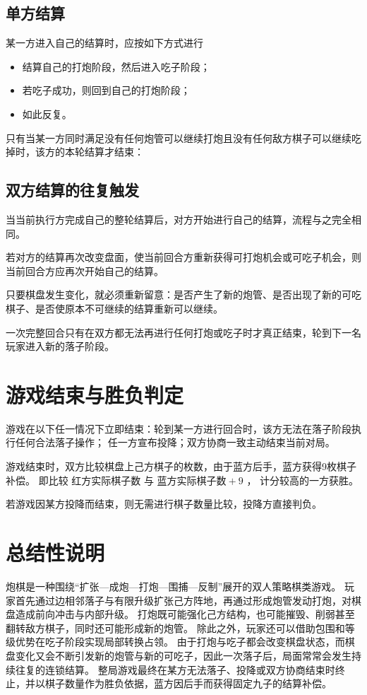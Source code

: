 \documentclass[12pt]{ctexart}
\begin{document}
\subsection{单方结算}

某一方进入自己的结算时，应按如下方式进行

\begin{itemize}
\item 结算自己的打炮阶段，然后进入吃子阶段；
\item 若吃子成功，则回到自己的打炮阶段；
\item 如此反复。
\end{itemize}

只有当某一方同时满足没有任何炮管可以继续打炮且没有任何敌方棋子可以继续吃掉时，该方的本轮结算才结束：

\subsection{双方结算的往复触发}

当当前执行方完成自己的整轮结算后，对方开始进行自己的结算，流程与之完全相同。

若对方的结算再次改变盘面，使当前回合方重新获得可打炮机会或可吃子机会，则当前回合方应再次开始自己的结算。

只要棋盘发生变化，就必须重新留意：是否产生了新的炮管、是否出现了新的可吃棋子、是否使原本不可继续的结算重新可以继续。

一次完整回合只有在双方都无法再进行任何打炮或吃子时才真正结束，轮到下一名玩家进入新的落子阶段。

\section{游戏结束与胜负判定}

游戏在以下任一情况下立即结束：轮到某一方进行回合时，该方无法在落子阶段执行任何合法落子操作；
任一方宣布投降；双方协商一致主动结束当前对局。

游戏结束时，双方比较棋盘上己方棋子的枚数，由于蓝方后手，蓝方获得9枚棋子补偿。
即比较 $\text{红方实际棋子数 与 蓝方实际棋子数}+9$ ，
计分较高的一方获胜。

若游戏因某方投降而结束，则无需进行棋子数量比较，投降方直接判负。

\section{总结性说明}

炮棋是一种围绕“扩张—成炮—打炮—围捕—反制”展开的双人策略棋类游戏。
玩家首先通过边相邻落子与有限升级扩张己方阵地，再通过形成炮管发动打炮，对棋盘造成前向冲击与内部升级。
打炮既可能强化己方结构，也可能摧毁、削弱甚至翻转敌方棋子，同时还可能形成新的炮管。
除此之外，玩家还可以借助包围和等级优势在吃子阶段实现局部转换占领。
由于打炮与吃子都会改变棋盘状态，而棋盘变化又会不断引发新的炮管与新的可吃子，因此一次落子后，局面常常会发生持续往复的连锁结算。
整局游戏最终在某方无法落子、投降或双方协商结束时终止，并以棋子数量作为胜负依据，蓝方因后手而获得固定九子的结算补偿。
\end{document}
